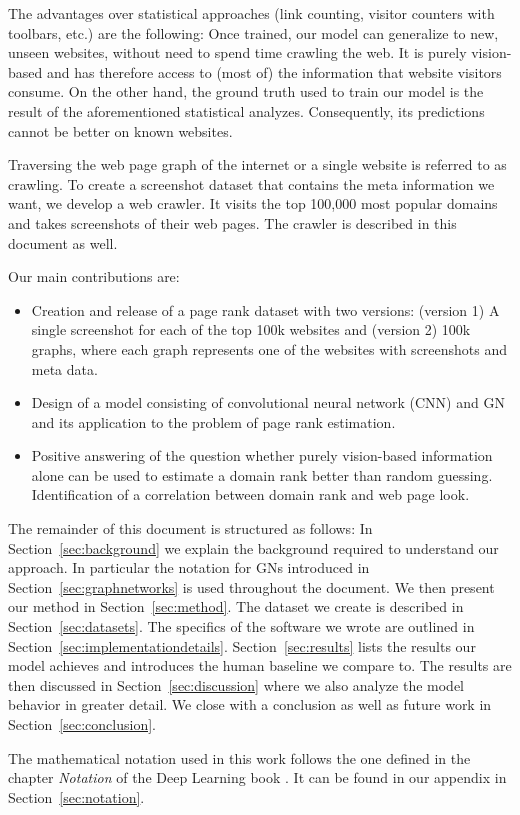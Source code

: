 The advantages over statistical approaches (link counting, visitor counters with toolbars, etc.) are the following: Once trained, our model can generalize to new, unseen websites, without need to spend time crawling the web. It is purely vision-based and has therefore access to (most of) the information that website visitors consume. On the other hand, the ground truth used to train our model is the result of the aforementioned statistical analyzes. Consequently, its  predictions cannot be better on known websites.

Traversing the web page graph of the internet or a single website is referred to as crawling. To create a screenshot dataset that contains the meta information we want, we develop a web crawler. It visits the top 100,000 most popular domains and takes screenshots of their web pages. The crawler is described in this document as well.

Our main contributions are:
\begin{itemize}
\item Creation and release of a page rank dataset with two versions: (version 1) A single screenshot for each of the top 100k websites and (version 2) 100k graphs, where each graph represents one of the websites with screenshots and meta data.
\item Design of a model consisting of convolutional neural network (CNN) and GN and its application to the problem of page rank estimation.
\item Positive answering of the question whether purely vision-based information alone can be used to estimate a domain rank better than random guessing. Identification of a correlation between domain rank and web page look.
\end{itemize}


The remainder of this document is structured as follows: In Section~\ref{sec:background} we explain the background required to understand our approach. In particular the notation for GNs introduced in Section~\ref{sec:graphnetworks} is used throughout the document. We then present our method in Section~\ref{sec:method}. The dataset we create is described in Section~\ref{sec:datasets}. The specifics of the software we wrote are outlined in Section~\ref{sec:implementationdetails}. Section~\ref{sec:results} lists the results our model achieves and introduces the human baseline we compare to. The results are then discussed in Section~\ref{sec:discussion} where we also analyze the model behavior in greater detail. We close with a conclusion as well as future work in Section~\ref{sec:conclusion}.

The mathematical notation used in this work follows the one defined in the chapter \textit{Notation} of the Deep Learning book \cite{goodfellow:dlbook}. It can be found in our appendix in Section~\ref{sec:notation}.
